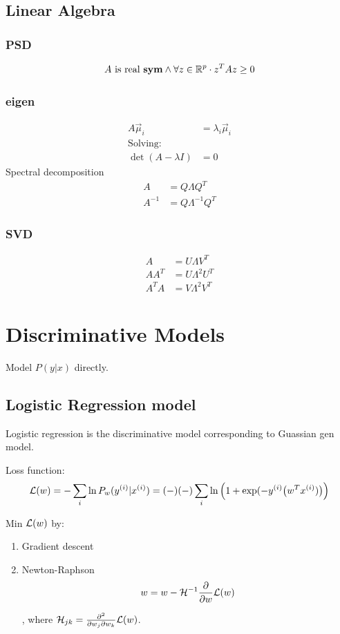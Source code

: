 \documentclass[a4paper]{report}
\begin{document}
\section{Linear Algebra}
\subsection{PSD}
$$
A \text{ is real \textbf{sym}} \wedge\forall z\in \mathbb{R}^p\cdot z^T Az \geq 0
$$
\subsection{eigen}
\begin{align*}
A \vec\mu_i &=\lambda_i \vec\mu_i\\
\text{Solving:} \\
\det(A-\lambda I) &= 0
\end{align*}
Spectral decomposition 
\begin{align*}
A &= Q\Lambda Q^T \\
A^{-1} &=Q\Lambda^{-1}Q^T
\end{align*}

\subsection{SVD}
\begin{align*}
A &= U\Lambda V^T\\
AA^T &= U\Lambda^2U^T \\
A^TA &= V\Lambda^2V^T
\end{align*}

\chapter{Discriminative Models}
Model $P(y|x)$ directly.
\section{Logistic Regression model}
Logistic regression is the discriminative model corresponding to Guassian gen model.

Loss function:
$$
\mathcal{L}(w) = -\sum_{i} \ln {P_w(y^{(i)}|x^{(i)})} = (-)(-) \sum_{i} \ln {\Big(1+\exp(-y^{(i)}\big(w^T x^{(i)})\big)\Big)}
$$

Min $\mathcal{L}(w)$ by:
\begin{enumerate}
\item Gradient descent
\item Newton-Raphson
$$
w = w -\mathcal{H}^{-1} \frac{\partial}{\partial w} \mathcal{L}(w)
$$

, where $\mathcal{H}_{jk} = \frac{\partial^2}{\partial w_j \partial w_k} \mathcal{L}(w)$.
\end{enumerate}
\end{document}
